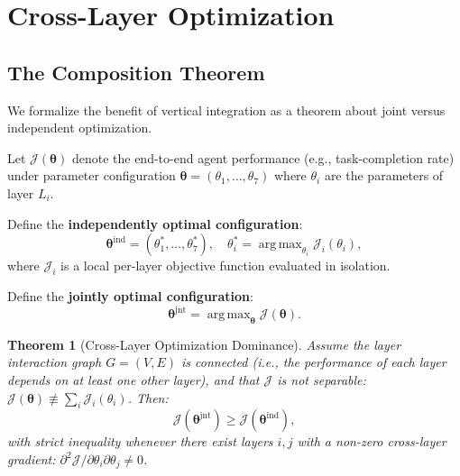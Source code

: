 \documentclass[11pt]{article}
\newtheorem{theorem}{Theorem}
\DeclareMathOperator*{\argmax}{arg\,max}
\begin{document}
\section{Cross-Layer Optimization}
\label{sec:optimization}

\subsection{The Composition Theorem}

We formalize the benefit of vertical integration as a theorem about joint
versus independent optimization.

Let $\mathcal{J}(\bm{\theta})$ denote the end-to-end agent performance (e.g.,
task-completion rate) under parameter configuration $\bm{\theta} =
(\theta_1, \ldots, \theta_7)$ where $\theta_i$ are the parameters of layer
$L_i$.

Define the \textbf{independently optimal configuration}:
\begin{equation}
    \bm{\theta}^{\text{ind}} = \left(\theta_1^*, \ldots, \theta_7^*\right),
    \quad \theta_i^* = \argmax_{\theta_i} \mathcal{J}_i(\theta_i),
\end{equation}
where $\mathcal{J}_i$ is a local per-layer objective function evaluated in
isolation.

Define the \textbf{jointly optimal configuration}:
\begin{equation}
    \bm{\theta}^{\text{jnt}} = \argmax_{\bm{\theta}} \mathcal{J}(\bm{\theta}).
\end{equation}

\begin{theorem}[Cross-Layer Optimization Dominance]
\label{thm:dominance}
Assume the layer interaction graph $G = (V, E)$ is connected (i.e., the
performance of each layer depends on at least one other layer), and that
$\mathcal{J}$ is not separable: $\mathcal{J}(\bm{\theta}) \not\equiv
\sum_i \mathcal{J}_i(\theta_i)$. Then:
\begin{equation}
    \mathcal{J}(\bm{\theta}^{\text{jnt}}) \geq \mathcal{J}(\bm{\theta}^{\text{ind}}),
\end{equation}
with strict inequality whenever there exist layers $i, j$ with a non-zero
cross-layer gradient: $\partial^2 \mathcal{J} / \partial\theta_i \partial\theta_j \neq 0$.
\end{theorem}
\end{document}
